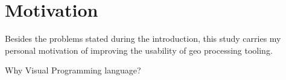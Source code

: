 \section{Motivation}

Besides the problems stated during the introduction, this study carries my personal motivation of improving the usability of geo processing tooling. 

Why Visual Programming language?